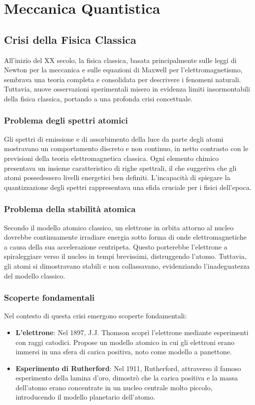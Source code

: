 \chapter{Meccanica Quantistica}

\section{Crisi della Fisica Classica}
All'inizio del XX secolo, la fisica classica, basata principalmente sulle leggi di Newton per la meccanica e sulle equazioni di Maxwell per l'elettromagnetismo, sembrava una teoria completa e consolidata per descrivere i fenomeni naturali. Tuttavia, nuove osservazioni sperimentali misero in evidenza limiti insormontabili della fisica classica, portando a una profonda crisi concettuale.

\subsection{Problema degli spettri atomici}
Gli spettri di emissione e di assorbimento della luce da parte degli atomi mostravano un comportamento discreto e non continuo, in netto contrasto con le previsioni della teoria elettromagnetica classica. Ogni elemento chimico presentava un insieme caratteristico di righe spettrali, il che suggeriva che gli atomi possedessero livelli energetici ben definiti. L'incapacit\`a di spiegare la quantizzazione degli spettri rappresentava una sfida cruciale per i fisici dell'epoca.

\subsection{Problema della stabilit\`a atomica}
Secondo il modello atomico classico, un elettrone in orbita attorno al nucleo dovrebbe continuamente irradiare energia sotto forma di onde elettromagnetiche a causa della sua accelerazione centripeta. Questo porterebbe l'elettrone a spiraleggiare verso il nucleo in tempi brevissimi, distruggendo l'atomo. Tuttavia, gli atomi si dimostravano stabili e non collassavano, evidenziando l'inadeguatezza del modello classico.

\subsection{Scoperte fondamentali}
Nel contesto di questa crisi emergono scoperte fondamentali:
\begin{itemize}
    \item \textbf{L'elettrone}: Nel 1897, J.J. Thomson scopr\`i l'elettrone mediante esperimenti con raggi catodici. Propose un modello atomico in cui gli elettroni erano immersi in una sfera di carica positiva, noto come modello a panettone.
    \item \textbf{Esperimento di Rutherford}: Nel 1911, Rutherford, attraverso il famoso esperimento della lamina d'oro, dimostr\`o che la carica positiva e la massa dell'atomo erano concentrate in un nucleo centrale molto piccolo, introducendo il modello planetario dell'atomo.
\end{itemize}

